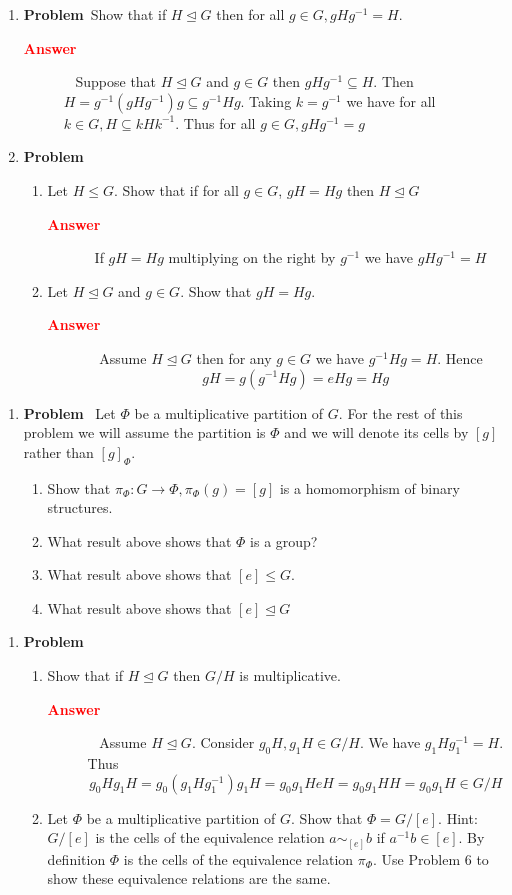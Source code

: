 \documentclass[12pt]{amsart}
\newcommand{\benu}{\begin{enumerate}}
\newcommand{\eenu}{\end{enumerate}}
\theoremstyle{definition}
\newcommand{\itep}{\item {\bfseries Problem}\ }
\newcommand{\beans}{\begin{description} \item[{ \bfseries \textcolor{red}{Answer}}]\ }
\newcommand{\eans }{\end{description}}
\begin{document}
\newpage

\begin{enumerate}[resume=p]
\itep  Show that if $H\unlhd G$ then for all $g\in G, gHg^{-1}=H$.
\beans
Suppose that $H\unlhd G$ and $g\in G$ then $gHg^{-1}\subseteq H$. Then $H=g^{-1}(gHg^{-1})g\subseteq g^{-1}Hg$. Taking $k=g^{-1}$ we have for all $k\in G, H\subseteq kHk^{-1}$. Thus for all $g\in G,gHg^{-1}=g$

\eans

\newpage

\itep 
\benu
\item Let $H\leq G$. Show that if for all $g\in G$, $gH=Hg$ then $H\unlhd G$
\beans If $gH=Hg$ multiplying on the right by $g^{-1}$ we have $gHg^{-1}=H$
\eans
\item Let $H\unlhd G$ and $g\in G$. Show that $gH=Hg$.  
\beans 
Assume $H\unlhd G$ then for any $g\in G$ we have $g^{-1}Hg=H$. Hence 
\[gH=g(g^{-1}Hg)=eHg=Hg
\]
\eans
\eenu
\end{enumerate}

\newpage

\begin{enumerate}[resume=p]
\itep \label{mp} Let $\Phi$ be a multiplicative partition of $G$. For the rest of this problem we will assume the partition is $\Phi$ and we will denote its cells by $[g]$ rather than $[g]_\Phi$. 
\benu 
 \item  Show that $\pi_\Phi\colon G\to \Phi,\pi_\Phi(g)=[g]$ is a homomorphism of binary structures.
\item What result above shows that $\Phi$ is a group?
\item What result above shows that $[e]\leq G$.
\item What result above shows that $[e]\unlhd G$
\eenu
\end{enumerate}

\newpage

\begin{enumerate}[resume=p]
\itep 
\benu

 \item Show that if $H\unlhd G$ then $G/H$ is multiplicative.
\beans
Assume  $H\unlhd G$. Consider $g_0H,g_1H\in G/H$. We have $g_1Hg_1^{-1}=H$. Thus 
\[g_0Hg_1H=g_0(g_1Hg_1^{-1})g_1H=g_0g_1HeH=g_0g_1HH=g_0g_1H\in G/H
\]
\eans
\item Let $\Phi$ be a multiplicative partition of $G$. Show that $\Phi=G/[e]$. Hint: $G/[e]$ is the cells of the equivalence relation $a\sim_{[e]} b$ if $a^{-1}b\in [e]$. By definition $\Phi$ is the cells of the equivalence relation $\pi_\Phi$. Use Problem 6 to show these equivalence relations are the same.
\eenu
\end{enumerate}
\end{document}
